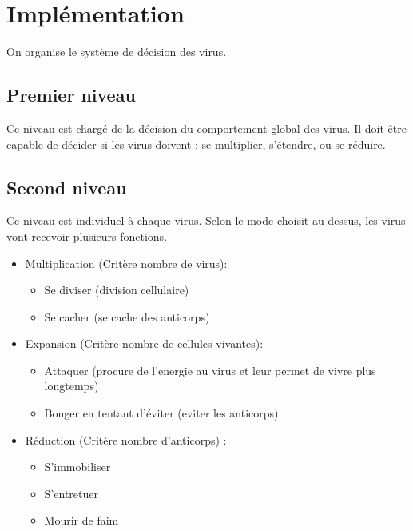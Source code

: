 \documentclass[11pt]{article} %
\begin{document}
\section{Implémentation}

On organise le système de décision des virus.

\subsection{Premier niveau}
Ce niveau est chargé de la décision du comportement global des virus. Il doit être capable de décider si les virus doivent : se multiplier, s'étendre, ou se réduire.

\subsection{Second niveau}
Ce niveau est individuel à chaque virus. Selon le mode choisit au dessus, les virus vont recevoir plusieurs fonctions.
\begin{itemize}
	\item Multiplication (Critère nombre de virus):
		\begin{itemize}
			\item Se diviser (division cellulaire)
			\item Se cacher (se cache des anticorps)
		\end{itemize}
	\item Expansion (Critère nombre de cellules vivantes):
	 	\begin{itemize}
	 		\item Attaquer (procure de l'energie au virus et leur permet de vivre plus longtemps)
	 		\item Bouger en tentant d'éviter (eviter les anticorps)
	 	\end{itemize}
	\item Réduction (Critère nombre d'anticorps) :
		\begin{itemize}
			\item S'immobiliser
			\item S'entretuer
			\item Mourir de faim 
		\end{itemize}
\end{itemize}


\nocite{ref2}


\end{document}

